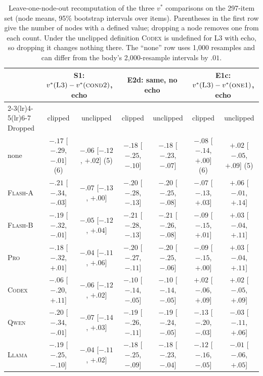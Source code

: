 \documentclass[11pt]{article}
\begin{document}
\begin{table}[h]
\centering\scriptsize
\setlength{\tabcolsep}{2.2pt}
\begin{tabular}{@{}lcccccc@{}}
\toprule
& \multicolumn{2}{c}{S1: $v^\ast(\textsc{L3})-v^\ast(\textsc{cond2})$, echo} & \multicolumn{2}{c}{E2d: same, no echo} & \multicolumn{2}{c}{E1c: $v^\ast(\textsc{L3})-v^\ast(\textsc{one1})$, echo} \\
\cmidrule(lr){2-3}\cmidrule(lr){4-5}\cmidrule(lr){6-7}
Dropped & clipped & unclipped & clipped & unclipped & clipped & unclipped \\
\midrule
none & $-.17$ [$-.29$, $-.01$] (6) & $-.06$ [$-.12$, $+.02$] (5) & $-.18$ [$-.25$, $-.10$] & $-.18$ [$-.23$, $-.07$] & $-.08$ [$-.14$, $+.00$] (6) & $+.02$ [$-.05$, $+.09$] (5) \\
\textsc{Flash-A} & $-.21$ [$-.34$, $-.03$] & $-.07$ [$-.13$, $+.00$] & $-.20$ [$-.28$, $-.13$] & $-.20$ [$-.25$, $-.08$] & $-.07$ [$-.13$, $+.03$] & $+.06$ [$-.01$, $+.14$] \\
\textsc{Flash-B} & $-.19$ [$-.32$, $-.01$] & $-.05$ [$-.12$, $+.04$] & $-.21$ [$-.28$, $-.13$] & $-.21$ [$-.26$, $-.08$] & $-.09$ [$-.15$, $+.01$] & $+.03$ [$-.04$, $+.11$] \\
\textsc{Pro} & $-.18$ [$-.32$, $+.01$] & $-.04$ [$-.11$, $+.06$] & $-.20$ [$-.27$, $-.11$] & $-.20$ [$-.25$, $-.06$] & $-.09$ [$-.15$, $+.00$] & $+.03$ [$-.04$, $+.11$] \\
\textsc{Codex} & $-.06$ [$-.20$, $+.11$] & $-.06$ [$-.12$, $+.02$] & $-.10$ [$-.14$, $-.05$] & $-.10$ [$-.14$, $-.05$] & $+.02$ [$-.06$, $+.09$] & $+.02$ [$-.05$, $+.09$] \\
\textsc{Qwen} & $-.20$ [$-.34$, $-.01$] & $-.07$ [$-.14$, $+.03$] & $-.19$ [$-.26$, $-.11$] & $-.19$ [$-.24$, $-.05$] & $-.13$ [$-.20$, $-.03$] & $-.03$ [$-.11$, $+.06$] \\
\textsc{Llama} & $-.19$ [$-.25$, $-.10$] & $-.04$ [$-.11$, $+.02$] & $-.18$ [$-.25$, $-.09$] & $-.18$ [$-.23$, $-.04$] & $-.12$ [$-.16$, $-.05$] & $-.01$ [$-.06$, $+.05$] \\
\bottomrule
\end{tabular}
\caption{Leave-one-node-out recomputation of the three $v^\ast$ comparisons on the 297-item set (node means, 95\% bootstrap intervals over items). Parentheses in the first row give the number of nodes with a defined value; dropping a node removes one from each count. Under the unclipped definition \textsc{Codex} is undefined for \textsc{L3} with echo, so dropping it changes nothing there. The ``none'' row uses 1{,}000 resamples and can differ from the body's 2{,}000-resample intervals by $.01$.}
\label{tab:loo}
\end{table}
\end{document}
